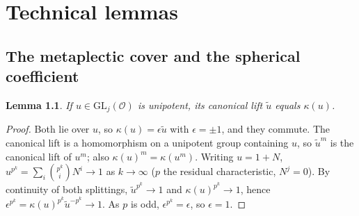 \documentclass[11pt,oneside,notitlepage]{book}
\numberwithin{equation}{section}
\theoremstyle{plain}
\newtheorem{lemma}[theorem]{Lemma}
\theoremstyle{definition}
\newcommand{\cO}{\mathcal{O}}
\newcommand{\GL}{\mathrm{GL}}
\begin{document}
\chapter{Technical lemmas}\label{app:technical}

\section{The metaplectic cover and the spherical coefficient}

\begin{lemma}\label{lem:unip-kappa}
If $u\in\GL_j(\cO)$ is unipotent, its canonical lift $\tilde u$ equals $\kappa(u)$.
\end{lemma}
\begin{proof}
Both lie over $u$, so $\kappa(u)=\epsilon\tilde u$ with $\epsilon=\pm1$, and they commute. The canonical lift is a homomorphism on a unipotent group containing $u$, so $\tilde u^m$ is the canonical lift of $u^m$; also $\kappa(u)^m=\kappa(u^m)$. Writing $u=1+N$, $u^{p^k}=\sum_i\binom{p^k}iN^i\to1$ as $k\to\infty$ ($p$ the residual characteristic, $N^j=0$). By continuity of both splittings, $\tilde u^{p^k}\to1$ and $\kappa(u)^{p^k}\to1$, hence $\epsilon^{p^k}=\kappa(u)^{p^k}\tilde u^{-p^k}\to1$. As $p$ is odd, $\epsilon^{p^k}=\epsilon$, so $\epsilon=1$.
\end{proof}
\end{document}
